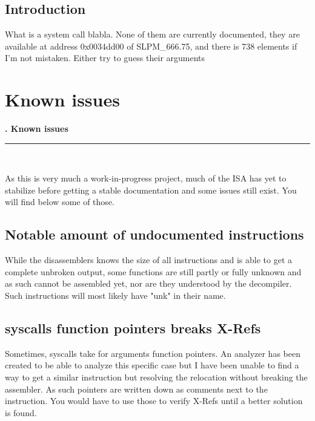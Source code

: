 \documentclass[openany,oneside]{memoir}
\newcommand{\Line}{\rule{\linewidth}{1.0mm}}
\newcommand{\Chapter}[1]{
\pagestyle{fancy}
\chapter{#1}
\begin{vplace}[0.7]
{\Huge   \null\hfill{\textbf{\thechapter.  #1}}} \\
\Line \\
\end{vplace} 
\newpage
}
\begin{document}
\section{Introduction}
What is a system call blabla.
None of them are currently documented, they are available at address 0x0034dd00
of SLPM\_666.75,  and there is 738 elements if I'm not mistaken. Either try to
guess their arguments 


\Chapter{Known issues}
As this is very much a work-in-progress project, much of the ISA has yet to
stabilize before getting a stable documentation and some issues still exist. You
will find below some of those.

\section{Notable amount of undocumented instructions}
While the disassemblers knows the size of all instructions and is able to get a
complete unbroken output, some functions are still partly or fully unknown and
as such cannot be assembled yet, nor are they understood by the decompiler. Such
instructions will most likely have "unk" in their name.

\section{syscalls function pointers breaks X-Refs}
Sometimes, syscalls take for arguments function pointers. An analyzer has been
created to be able to analyze this specific case but I have been unable to find
a way to get a similar instruction but resolving the relocation without breaking
the assembler.
As such pointers are written down as comments next to the instruction. You would
have to use those to verify X-Refs until a better solution is found.
\end{document}
